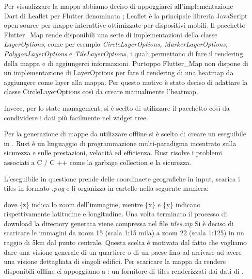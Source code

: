 \documentclass[a4paper]{report}
\begin{document}
Per visualizzare la mappa abbiamo deciso di appoggiarci all'implementazione Dart di Leaflet per Flutter denominata \cite{FlutterMap}; Leaflet è la principale libreria JavaScript open source per mappe interattive ottimizzate per dispositivi mobili. Il pacchetto Flutter\_Map rende disponibili una serie di implementazioni della classe \textit{LayerOptions}, come per esempio \textit{CircleLayerOptions, MarkerLayerOptions, PolygonLayerOptions} e \textit{TileLayerOptions}, i quali permettono di fare il rendering della mappa e di aggiungerci informazioni. 
Purtoppo Flutter\_Map non dispone di un implementazione di LayerOptions per fare il rendering di una heatmap da aggiungere come layer alla mappa. Per questo motivo è stato deciso di adattare la classe CircleLayerOptions così da creare manualmente l'heatmap.

Invece, per lo state management, si è scelto di utilizzare il pacchetto \cite{Provider} così da condividere i dati più facilmente nel widget tree. 
 
Per la generazione di mappe da utilizzare offline si è scelto di creare un eseguibile in \cite{Rust}. Rust è un linguaggio di programmazione multi-paradigma incentrato sulla sicurezza e sulle prestazioni, velocità ed efficienza. Rust risolve i problemi associati a C / C ++ come la garbage collection e la sicurezza\cite*{RustArticle}.


L'eseguibile in questione prende delle coordinaete geografiche in input, scarica i tiles in formato \textit{.png} e li organizza in cartelle nella seguente maniera:
\begin{center}
    {\setnewpathsep{/} }
\end{center}
dove \{z\} indica lo zoom dell'immagine, mentre \{x\} e \{y\} indicano rispettivamente latitudine e longitudine.
Una volta terminato il processo di download la directory generata viene compressa nel file \textit{tiles.zip}
Si è deciso di scaricare le immagini da zoom 15 (scala 1:15 mila) a zoom 22 (scala 1:125) in un raggio di 5km dal punto centrale. Questa scelta è motivata dal fatto che vogliamo dare una visione generale di un quartiere o di un paese fino ad arrivare ad avere una visione dettagliata di singoli edifici.
Per scaricare la mappa da rendere disponibili offline ci appoggiamo a \cite{Thunderforest}: un fornitore di tiles renderizzati dai dati di \cite{OpenStreetMap}.
\end{document}
